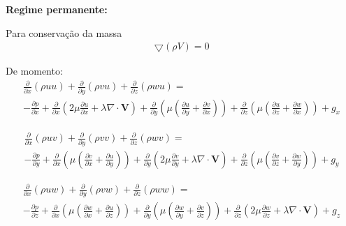 \documentclass[]{article}
\begin{document}
\textbf{Regime permanente:} 

Para conservação da massa
\begin{equation}
	\begin{aligned}
		  \bigtriangledown (\rho V)= 0 
	\end{aligned}
\end{equation}

De momento:
\begin{equation}
	\begin{aligned}
		\frac{\partial}{\partial x} (\rho u u) + \frac{\partial}{\partial y} (\rho v u) + \frac{\partial}{\partial z} (\rho w u) = \\
		- \frac{\partial p}{\partial x} + \frac{\partial}{\partial x} \left( 2 \mu \frac{\partial u}{\partial x} + \lambda \nabla \cdot \mathbf{V} \right) +
		\frac{\partial}{\partial y} \left( \mu \left( \frac{\partial u}{\partial y} + \frac{\partial v}{\partial x} \right) \right) +
		\frac{\partial}{\partial z} \left( \mu \left( \frac{\partial u}{\partial z} + \frac{\partial w}{\partial x} \right) \right) + g_x
	\end{aligned}
\end{equation}

\begin{equation}
	\begin{aligned}
		\frac{\partial}{\partial x} (\rho u v) + \frac{\partial}{\partial y} (\rho v v) + \frac{\partial}{\partial z} (\rho w v) = \\
		- \frac{\partial p}{\partial y} + \frac{\partial}{\partial x} \left( \mu \left( \frac{\partial v}{\partial x} + \frac{\partial u}{\partial y} \right) \right) +
		\frac{\partial}{\partial y} \left( 2 \mu \frac{\partial v}{\partial y} + \lambda \nabla \cdot \mathbf{V} \right) +
		\frac{\partial}{\partial z} \left( \mu \left( \frac{\partial v}{\partial z} + \frac{\partial w}{\partial y} \right) \right) +  g_y
	\end{aligned}
\end{equation}

\begin{equation}
	\begin{aligned}
		 \frac{\partial}{\partial x} (\rho u w) + \frac{\partial}{\partial y} (\rho v w) + \frac{\partial}{\partial z} (\rho w w) = \\
		- \frac{\partial p}{\partial z} + \frac{\partial}{\partial x} \left( \mu \left( \frac{\partial w}{\partial x} + \frac{\partial u}{\partial z} \right) \right) +
		\frac{\partial}{\partial y} \left( \mu \left( \frac{\partial w}{\partial y} + \frac{\partial v}{\partial z} \right) \right) +
		\frac{\partial}{\partial z} \left( 2 \mu \frac{\partial w}{\partial z} + \lambda \nabla \cdot \mathbf{V} \right) +  g_z
	\end{aligned}
\end{equation}
\end{document}
